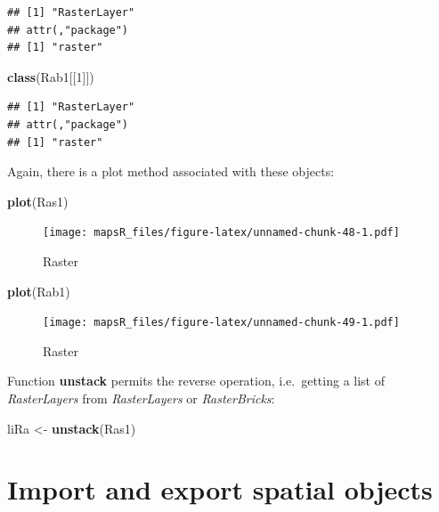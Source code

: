 \documentclass[]{report}
\newenvironment{Shaded}{\begin{snugshade}}{\end{snugshade}}
\newcommand{\KeywordTok}[1]{\textcolor[rgb]{0.13,0.29,0.53}{\textbf{{#1}}}}
\newcommand{\DecValTok}[1]{\textcolor[rgb]{0.00,0.00,0.81}{{#1}}}
\newcommand{\StringTok}[1]{\textcolor[rgb]{0.31,0.60,0.02}{{#1}}}
\newcommand{\NormalTok}[1]{{#1}}
\begin{document}
\begin{verbatim}
## [1] "RasterLayer"
## attr(,"package")
## [1] "raster"
\end{verbatim}

\begin{Shaded}
\begin{Highlighting}[]
\KeywordTok{class}\NormalTok{(Rab1[[}\DecValTok{1}\NormalTok{]])}
\end{Highlighting}
\end{Shaded}

\begin{verbatim}
## [1] "RasterLayer"
## attr(,"package")
## [1] "raster"
\end{verbatim}

Again, there is a plot method associated with these objects:

\begin{Shaded}
\begin{Highlighting}[]
\KeywordTok{plot}\NormalTok{(Ras1)}
\end{Highlighting}
\end{Shaded}

\begin{figure}[htbp]
\centering
\texttt{[image: mapsR\_files/figure-latex/unnamed-chunk-48-1.pdf]}
\caption{Raster}
\end{figure}

\begin{Shaded}
\begin{Highlighting}[]
\KeywordTok{plot}\NormalTok{(Rab1)}
\end{Highlighting}
\end{Shaded}

\begin{figure}[htbp]
\centering
\texttt{[image: mapsR\_files/figure-latex/unnamed-chunk-49-1.pdf]}
\caption{Raster}
\end{figure}

Function \textbf{unstack} permits the reverse operation, i.e.~getting a
list of \emph{RasterLayers} from \emph{RasterLayers} or
\emph{RasterBricks}:

\begin{Shaded}
\begin{Highlighting}[]
\NormalTok{liRa <-}\StringTok{ }\KeywordTok{unstack}\NormalTok{(Ras1)}
\end{Highlighting}
\end{Shaded}

\chapter{Import and export spatial
objects}\label{import-and-export-spatial-objects}
\end{document}
